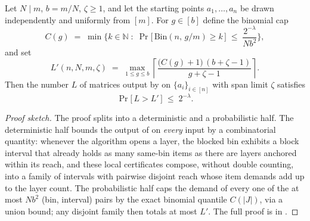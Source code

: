 %
%
%

\providecommand{\Bin}{\mathrm{Bin}}
\providecommand{\ext}{\mathrm{ext}}


\begin{lemma}
\label{lemma:Lprime}
Let $N \mid m$, $b = m/N$, $\zeta \ge 1$, and let the starting points
$a_1, \dots, a_n$ be drawn independently and uniformly from $[m]$. For
$g \in [b]$ define the binomial cap
\[
  C(g) \;=\; \min\Big\{ k \in \mathbb{N} \;:\;
     \Pr\big[\, \Bin(n,\, g/m) \ge k \,\big]
     \;\le\; \frac{2^{-\lambda}}{N b^2} \Big\},
\]
and set
\[
  L'(n, N, m, \zeta)
  \;=\; \max_{1 \le g \le b}
     \left\lceil \frac{\big(C(g)+1\big)\,(b+\zeta-1)}{g+\zeta-1} \right\rceil .
\]
Then the number $L$ of matrices output by  on
$\{a_i\}_{i \in [n]}$ with span limit $\zeta$ satisfies
\[
  \Pr\big[\, L > L' \,\big] \;\le\; 2^{-\lambda}.
\]
\end{lemma}

\begin{proof}[Proof sketch]
The proof splits into a deterministic and a probabilistic half. The
deterministic half bounds the output of  on \emph{every}
input by a combinatorial quantity: whenever the algorithm opens a layer, the
blocked bin exhibits a block interval that already holds as many same-bin
items as there are layers anchored within its reach, and these local
certificates compose, without double counting, into a family of intervals
with pairwise disjoint reach whose item demands add up to the layer count.
The probabilistic half caps the demand of every one of the at most $N b^2$
(bin, interval) pairs by the exact binomial quantile $C(|J|)$, via a union
bound; any disjoint family then totals at most $L'$. The full proof is in
.
\end{proof}

